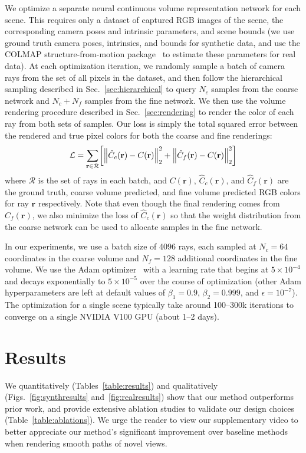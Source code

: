 \documentclass[runningheads]{llncs}
\let\originalleft\left
\let\originalright\right
\renewcommand{\left}{\mathopen{}\mathclose\bgroup\originalleft}
\renewcommand{\right}{\aftergroup\egroup\originalright}
\newcommand{\norm}[1]{\left\lVert#1\right\rVert}
\newcommand{\numsamplescoarse}{N_c}
\newcommand{\numsamplesfine}{N_f}
\newcommand{\ray}{\mathbf{r}}
\newcommand{\Ltrain}{\mathcal{L}}
\newcommand{\raybatch}{\mathcal{R}}
\newcommand{\Ccoarse}{\hat{C}_c(\ray)}
\newcommand{\Cfine}{\hat{C}_f(\ray)}
\newcommand{\Ctrue}{C(\ray)}
\begin{document}
We optimize a separate neural continuous volume representation network for each scene. This requires only a dataset of captured RGB images of the scene, the corresponding camera poses and intrinsic parameters, and scene bounds (we use ground truth camera poses, intrinsics, and bounds for synthetic data, and use the COLMAP structure-from-motion package~\cite{colmap} to estimate these parameters for real data). At each optimization iteration, we randomly sample a batch of camera rays from the set of all pixels in the dataset, and then follow the hierarchical sampling described in Sec.~\ref{sec:hierarchical} to query $\numsamplescoarse$ samples from the coarse network and $\numsamplescoarse+\numsamplesfine$ samples from the fine network. We then use the volume rendering procedure described in Sec.~\ref{sec:rendering} to render the color of each ray from both sets of samples. Our loss is simply the total squared error between the rendered and true pixel colors for both the coarse and fine renderings:
\begin{equation}
\Ltrain=\sum_{\ray\in\raybatch}\left[\norm{\Ccoarse-\Ctrue}_2^2+\norm{\Cfine-\Ctrue}_2^2\right]
\end{equation}
where $\raybatch$ is the set of rays in each batch, and $\Ctrue$, $\Ccoarse$, and $\Cfine$ are the ground truth, coarse volume predicted, and fine volume predicted RGB colors for ray $\ray$ respectively. Note that even though the final rendering comes from $\Cfine$, we also minimize the loss of $\Ccoarse$ so that the weight distribution from the coarse network can be used to allocate samples in the fine network.

In our experiments, we use a batch size of 4096 rays, each sampled at $\numsamplescoarse=64$ coordinates in the coarse volume and $\numsamplesfine=128$ additional coordinates in the fine volume. We use the Adam optimizer~\cite{KingmaB15} with a learning rate that begins at $5 \times 10^{-4}$ and decays exponentially to $5 \times 10^{-5}$ over the course of optimization (other Adam hyperparameters are left at default values of $\beta_1=0.9$, $\beta_2=0.999$, and $\epsilon=10^{-7}$). The optimization for a single scene typically take around 100--300k iterations to converge on a single NVIDIA V100 GPU (about 1--2 days).

\section{Results}

We quantitatively (Tables~\ref{table:results}) and qualitatively (Figs.~\ref{fig:synthresults} and~\ref{fig:realresults}) show that our method outperforms prior work, and provide extensive ablation studies to validate our design choices (Table~\ref{table:ablations}). We urge the reader to view our supplementary video to better appreciate our method's significant improvement over baseline methods when rendering smooth paths of novel views.
\end{document}
